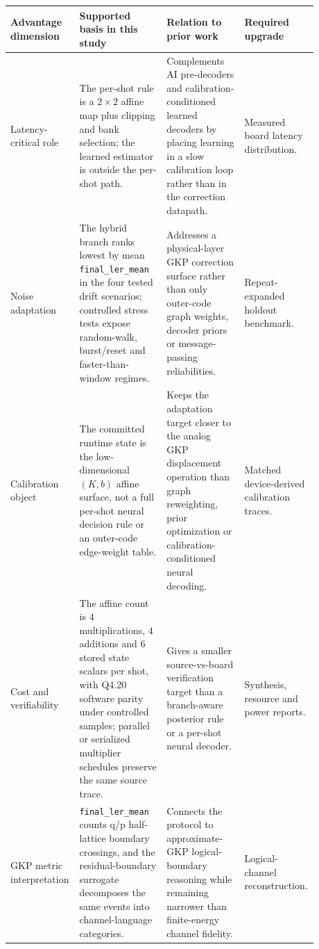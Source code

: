 \documentclass[11pt]{article}
\newcommand{\finalLER}{\texttt{final\_ler\_mean}}
\begin{document}
\begin{table}[t]
\centering
\small
\begin{tabular}{@{}>{\raggedright\arraybackslash}p{0.20\linewidth}>{\raggedright\arraybackslash}p{0.28\linewidth}>{\raggedright\arraybackslash}p{0.25\linewidth}>{\raggedright\arraybackslash}p{0.15\linewidth}@{}}
\toprule
Advantage dimension & Supported basis in this study & Relation to prior work & Required upgrade \\
\midrule
Latency-critical role &
The per-shot rule is a \(2\times2\) affine map plus clipping and bank selection;
the learned estimator is outside the per-shot path. &
Complements AI pre-decoders and calibration-conditioned learned decoders by
placing learning in a slow calibration loop rather than in the correction
datapath. &
Measured board latency distribution. \\
\addlinespace
Noise adaptation &
The hybrid branch ranks lowest by mean \finalLER{} in the four tested drift
scenarios; controlled stress tests expose random-walk, burst/reset and
faster-than-window regimes. &
Addresses a physical-layer GKP correction surface rather than only
outer-code graph weights, decoder priors or message-passing reliabilities. &
Repeat-expanded holdout benchmark. \\
\addlinespace
Calibration object &
The committed runtime state is the low-dimensional \((K,b)\) affine surface,
not a full per-shot neural decision rule or an outer-code edge-weight table. &
Keeps the adaptation target closer to the analog GKP displacement operation
than graph reweighting, prior optimization or calibration-conditioned neural
decoding. &
Matched device-derived calibration traces. \\
\addlinespace
Cost and verifiability &
The affine count is \(4\) multiplications, \(4\) additions and \(6\) stored
state scalars per shot, with Q4.20 software parity under controlled samples;
parallel or serialized multiplier schedules preserve the same source trace. &
Gives a smaller source-vs-board verification target than a branch-aware
posterior rule or a per-shot neural decoder. &
Synthesis, resource and power reports. \\
\addlinespace
GKP metric interpretation &
\finalLER{} counts q/p half-lattice boundary crossings, and the
residual-boundary surrogate decomposes the same events into channel-language
categories. &
Connects the protocol to approximate-GKP logical-boundary reasoning while
remaining narrower than finite-energy channel fidelity. &
Logical-channel reconstruction. \\

\end{tabular}
\end{table}
\end{document}
